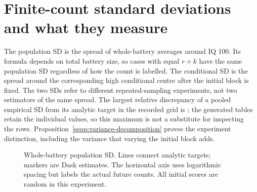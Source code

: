 \chapter{Finite-count standard deviations and what they measure}
\label{sec:seq-sim-sds}



The population SD is the spread of whole-battery averages around IQ 100.
Its formula depends on total battery size, so cases with equal \(r+k\)
have the same population SD regardless of how the count is labelled.
The conditional SD is the spread around the corresponding high
conditional centre after the initial block is fixed. The two SDs refer
to different repeated-sampling experiments, not two estimators of the
same spread. The largest relative discrepancy of a pooled empirical SD
from its analytic target in the recorded grid is
\SimMaxSDRelativeError{}; the generated tables retain the individual
values, so this maximum is not a substitute for inspecting the rows.
Proposition~\ref{seqp:variance-decomposition} proves the experiment
distinction, including the variance that varying the initial block adds.

\begin{figure}[htbp]
\centering
{}
\caption{Whole-battery population SD. Lines connect analytic targets;
markers are Dask estimates. The horizontal axis uses logarithmic spacing
but labels the actual future counts. All initial scores are random in
this experiment.}
\end{figure}

